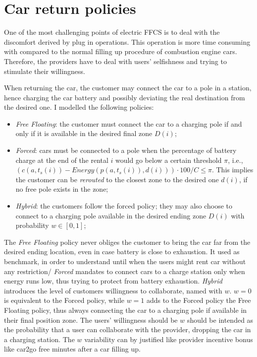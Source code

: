 \section{Car return policies}
\label{sec:5_4_return_policy}
One of the most challenging points of electric FFCS is to deal with the discomfort derived by plug in operations. This operation is more time consuming with compared to the normal filling up procedure of combustion engine cars. Therefore, the providers have to deal with users' selfishness and trying to stimulate their willingness.  

When returning the car, the customer may connect the car to a pole in a station, hence charging the car battery and possibly deviating the real destination from the desired one. I modelled the following policies:
\begin{itemize}
	\item{\it Free Floating}: the customer must connect the car to a charging pole if and only if it is available in the desired final zone $D(i)$;
	\item{\it Forced}: cars must be connected to a pole when the percentage of battery charge at the end of the rental $i$ would go below a certain threshold $\pi$, i.e., $(c(a,t_{s}(i)) - Energy(p(a,t_{s}(i)), d(i))) \cdot 100/ C\leq  \pi $. This implies the customer can be \textit{rerouted} to the closest zone to the desired one $d(i)$, if no free pole exists in the zone; %
	\item{\it Hybrid}: the customers follow the forced policy; they may  also choose to connect to a charging pole available in the desired ending zone $D(i)$ with probability $w\in [0,1]$;
\end{itemize}

The \textit{Free Floating} policy never obliges the customer to bring the car far from the desired ending location, even in case battery is close to exhaustion. It used as benchmark, in order to understand until when the users might rent car without any restriction/
\textit{Forced} mandates to connect cars to a charge station only when energy runs low, thus trying to protect from battery exhaustion.
\textit{Hybrid} introduces the level of customers willingness to collaborate, named with $w$. $w=0$ is equivalent to the Forced policy, while $w=1$ adds to the Forced policy the Free Floating policy,  thus always connecting the car to a charging pole if available in their final position zone. The users' willingness should be $w$ should be intended as the probability that a user can collaborate with the provider, dropping the car in a charging station. The $w$ variability can by justified like provider incentive bonus like car2go free minutes after a car filling up.

